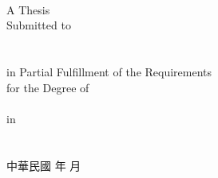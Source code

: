 \begin{center}
%
\vfill
\makebox[4cm][s]{\univCname}\\%
\makebox[6cm][s]{\deptCname}\\%
\\%
%
\vfill
\large
A Thesis\\%
Submitted to %
%
\fulldeptEname\\%
%
%
\ifx \collEname  \itsempty
\relax %
\else
\collEname\\%
\fi
%
\univEname\\%
%
in Partial Fulfillment of the Requirements\\
%
for the Degree of\\
%
\degreeEname\\%
%
in\\
%
\deptEname\\%
%
\eMonth\ \eYear\\%
%
\ePlace%
\vfill
中華民國%
\cYear%
年%
\cMonth%
月\\
\end{center}
\normalsize
\clearpage
